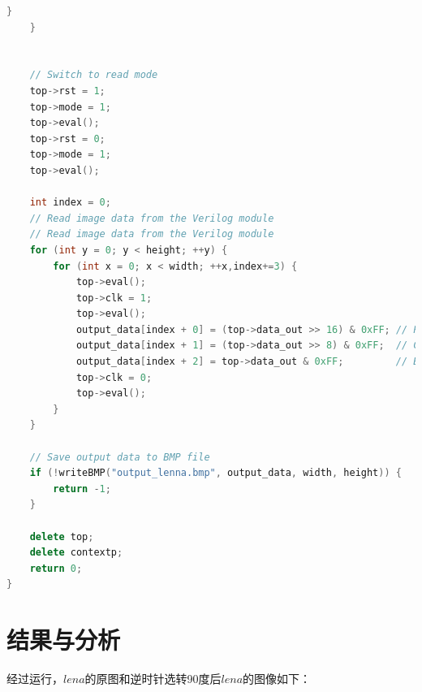 \documentclass[12pt, a4paper]{article}
\begin{document}
\begin{lstlisting}[language=c++]
        }
    }


    // Switch to read mode
    top->rst = 1;
    top->mode = 1;
    top->eval();
    top->rst = 0;
    top->mode = 1;
    top->eval();

    int index = 0;
    // Read image data from the Verilog module
    // Read image data from the Verilog module
    for (int y = 0; y < height; ++y) {
        for (int x = 0; x < width; ++x,index+=3) {
            top->eval();
            top->clk = 1;
            top->eval();
            output_data[index + 0] = (top->data_out >> 16) & 0xFF; // R
            output_data[index + 1] = (top->data_out >> 8) & 0xFF;  // G
            output_data[index + 2] = top->data_out & 0xFF;         // B
            top->clk = 0;
            top->eval();
        }
    }

    // Save output data to BMP file
    if (!writeBMP("output_lenna.bmp", output_data, width, height)) {
        return -1;
    }

    delete top;
    delete contextp;
    return 0;
}
\end{lstlisting}

\section{结果与分析}
经过运行，$lena$的原图和逆时针选转90度后$lena$的图像如下：
\end{document}
